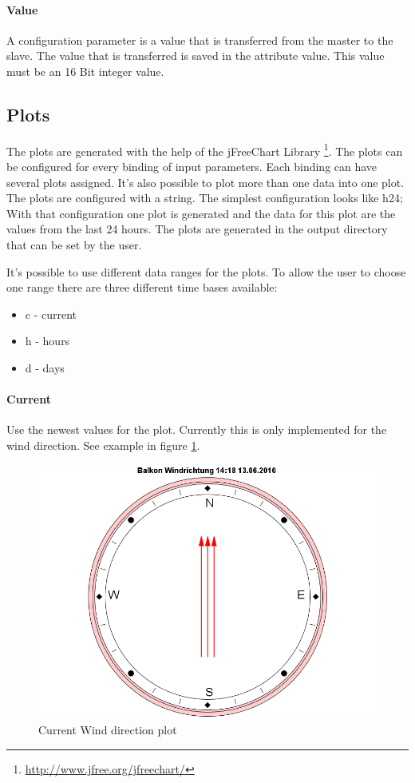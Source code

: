\paragraph{Value} %
\label{par:value}
A configuration parameter is a value that is transferred from the master to the slave. The value that is transferred is saved in the attribute value. This value must be an 16 Bit integer value.


\subsection{Plots} %
\label{sub:plots}
The plots are generated with the help of the jFreeChart Library \footnote{\url{http://www.jfree.org/jfreechart/}}.
The plots can be configured for every binding of input parameters. Each binding can have several plots assigned. It's also possible to plot more than one data into one plot. The plots are configured with a string. The simplest configuration looks like {\C h24;} With that configuration one plot is generated and the data for this plot are the values from the last 24 hours. The plots are generated in the output directory that can be set by the user.

It's possible to use different data ranges for the plots. To allow the user to choose one range there are three different time bases available:
\begin{itemize}
	\item c - current
	\item h - hours
	\item d - days
\end{itemize}

\paragraph{Current} %
\label{par:current}
Use the newest values for the plot. Currently this is only implemented for the wind direction. See example in figure \ref{fig:current}.
\begin{figure}[ht]
    \centering
    \includegraphics[width=0.9\linewidth]{master/plot_examplec.png}
    \caption{Current Wind direction plot}
    \label{fig:current}
\end{figure}

